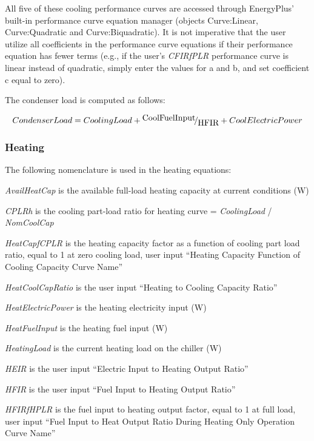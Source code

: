 All five of these cooling performance curves are accessed through EnergyPlus' built-in performance curve equation manager (objects Curve:Linear, Curve:Quadratic and Curve:Biquadratic). It is not imperative that the user utilize all coefficients in the performance curve equations if their performance equation has fewer terms (e.g., if the user's \emph{CFIRfPLR} performance curve is linear instead of quadratic, simply enter the values for a and b, and set coefficient c equal to zero).

The condenser load is computed as follows:

\begin{equation}
CondenserLoad = CoolingLoad + {\raise0.7ex\hbox{{CoolFuelInput}} \!\mathord{\left/ {\vphantom {{CoolFuelInput} {HFIR}}}\right.}\!\lower0.7ex\hbox{{HFIR}}} + CoolElectricPower
\end{equation}

\subsubsection{Heating}\label{heating}

The following nomenclature is used in the heating equations:

\emph{AvailHeatCap} is the available full-load heating capacity at current conditions (W)

\emph{CPLRh} is the cooling part-load ratio for heating curve = \emph{CoolingLoad} / \emph{NomCoolCap}

\emph{HeatCapfCPLR} is the heating capacity factor as a function of cooling part load ratio, equal to 1 at zero cooling load, user input ``Heating Capacity Function of Cooling Capacity Curve Name''

\emph{HeatCoolCapRatio} is the user input ``Heating to Cooling Capacity Ratio''

\emph{HeatElectricPower} is the heating electricity input (W)

\emph{HeatFuelInput} is the heating fuel input (W)

\emph{HeatingLoad} is the current heating load on the chiller (W)

\emph{HEIR} is the user input ``Electric Input to Heating Output Ratio''

\emph{HFIR} is the user input ``Fuel Input to Heating Output Ratio''

\emph{HFIRfHPLR} is the fuel input to heating output factor, equal to 1 at full load, user input ``Fuel Input to Heat Output Ratio During Heating Only Operation Curve Name''

